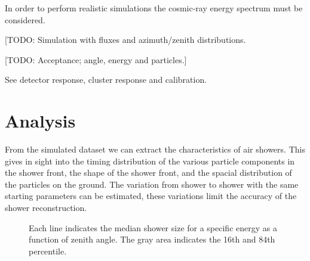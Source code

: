 In order to perform realistic simulations the cosmic-ray energy spectrum
must be considered.

[TODO: Simulation with fluxes and azimuth/zenith distributions.

[TODO: Acceptance; angle, energy and particles.]

See detector response, cluster response and calibration.


\section{Analysis}

From the simulated dataset we can extract the characteristics of air showers. This gives in sight into the timing distribution of the various particle components in the shower front, the shape of the shower front, and the spacial distribution of the particles on the ground. The variation from shower to shower with the same starting parameters can be estimated, these variations limit the accuracy of the shower reconstruction.

\begin{figure}
    \centering
    
    \caption{
             Each line indicates the median shower size for a specific
             energy as a function of zenith angle. The gray area
             indicates the 16th and 84th percentile.}
    \label{fig:simulations_shower_sizes}
\end{figure}
